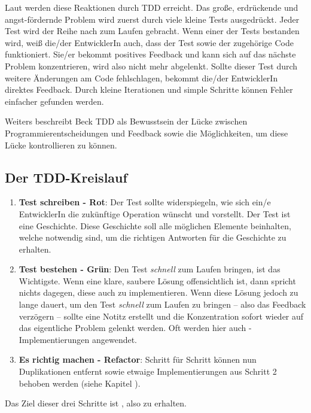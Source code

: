 Laut \cite{Beck:2003} werden diese Reaktionen durch TDD erreicht. Das große, erdrückende und angst-fördernde Problem wird zuerst durch viele kleine Tests ausgedrückt. Jeder Test wird der Reihe nach zum Laufen gebracht. Wenn einer der Tests bestanden wird, weiß die/der EntwicklerIn auch, dass der Test sowie der zugehörige Code funktioniert. Sie/er bekommt positives Feedback und kann sich auf das nächste Problem konzentrieren, wird also nicht mehr abgelenkt. Sollte dieser Test durch weitere Änderungen am Code fehlschlagen, bekommt die/der EntwicklerIn direktes Feedback. Durch kleine Iterationen und simple Schritte können Fehler einfacher gefunden werden.

Weiters beschreibt Beck TDD als Bewusstsein der Lücke zwischen Programmierentscheidungen und Feedback sowie die Möglichkeiten, um diese Lücke kontrollieren zu können.

\subsection{Der TDD-Kreislauf}
\begin{enumerate}
  \item \textbf{Test schreiben - Rot}:\newline
  Der Test sollte widerspiegeln, wie sich ein/e EntwicklerIn die zukünftige Operation wünscht und vorstellt. Der Test ist eine Geschichte. Diese Geschichte soll alle möglichen Elemente beinhalten, welche notwendig sind, um die richtigen Antworten für die Geschichte zu erhalten.
  \item \textbf{Test bestehen - Grün}:\newline
  Den Test \textit{schnell} zum Laufen bringen, ist das Wichtigste. Wenn eine klare, saubere Lösung offensichtlich ist, dann spricht nichts dagegen, diese auch zu implementieren. Wenn diese Lösung jedoch zu lange dauert, um den Test \textit{schnell} zum Laufen zu bringen -- also das  Feedback verzögern -- sollte eine Notitz erstellt und die Konzentration sofort wieder auf das eigentliche Problem gelenkt werden. Oft werden hier auch -Implementierungen angewendet.
  \item \textbf{Es richtig machen - Refactor}:\newline
  Schritt für Schritt können nun Duplikationen entfernt sowie etwaige  Implementierungen aus Schritt 2 behoben werden (siehe Kapitel ).
\end{enumerate}

Das Ziel dieser drei Schritte ist , also  zu erhalten.

